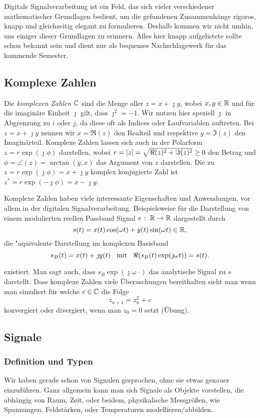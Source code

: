 %
Digitale Signalverarbeitung ist ein Feld, das sich vieler verschiedener mathematischer Grundlagen bedient, um die gefundenen Zusammenh\"ange rigoros, knapp und gleichzeitig elegant zu formulieren.
Deshalb kommen wir nicht umhin, uns einiger dieser Grundlagen zu erinnern. 
Alles hier knapp aufgelistete sollte schon bekannt sein und dient nur als bequemes Nachschlagewerk f\"ur das kommende Semester.
%
\subsection{Komplexe Zahlen}
%
Die \emph{komplexen Zahlen} $\mathbb{C}$ sind die Menge aller $z = x + \jmath y$, wobei $x,y \in \mathbb{R}$ und f\"ur die imagin\"are Einheit $\jmath$ gilt, dass $\jmath^2 = -1$.
Wir nutzen hier speziell $\jmath$ in Abgrenzung zu $i$ oder $j$, da diese oft als Indices oder Laufvariablen auftreten.
Bei $z = x + \jmath y$ nennen wir $x =\Re(z)$ den Realteil und respektive $y = \Im(z)$ den Imagin\"arteil.
Komplexe Zahlen lassen sich auch in der Polarform $z = r \exp(\jmath \phi)$ darstellen, wobei $r = {\left| z \right|} = \sqrt{\Re(z)^2 + \Im(z)^2} \geq 0$ den Betrag und $\phi = \angle(z) = \arctan(y,x)$ das Argument von $z$ darstellen.
Die zu $z = r \exp(\jmath \phi) = x + \jmath y$ komplex konjugierte Zahl ist $z^\ast = r \exp(-\jmath \phi) = x - \jmath y$.

Komplexe Zahlen haben viele interessante Eigenschaften und Anwendungen, vor allem in der digitalen Signalverarbeitung.
Beispielsweise f\"ur die Darstellung von einem modulierten reellen Passband Signal $s \hspace{0.5mm}:\hspace{1.0mm} \mathbb{R} \rightarrow \mathbb{R}$ dargestellt durch
\[
s(t) = x(t)\cos(\omega t) + y(t)\sin(\omega t) \in \mathbb{R},
\]
die "aquivalente Darstellung im komplexen Basisband
\begin{equation}\label{complex_baseband}
    s_B(t) = x(t) + \jmath y(t) {\hspace{3mm} \text{mit} \hspace{3mm}} \Re(s_B(t)\exp(\jmath \omega t)) = s(t).
\end{equation}

existiert. Man sagt auch, dass $s_B \exp(\jmath \omega \cdot)$ das analytische Signal zu $s$ darstellt. Dass komplexe Zahlen viele \"Uberaschungen bereithalten sieht man wenn man simuliert f\"ur welche $c \in \mathbb{C}$ die Folge
\[
z_{n+1} = z_{n}^2 + c
\]
konvergiert oder divergiert, wenn man $z_0 = 0$ setzt (\"Ubung). 
%
%
\subsection{Signale}
%
\subsubsection{Definition und Typen}
%
Wir haben gerade schon von Signalen gesprochen, ohne sie etwas genauer einzuf\"uhren. 
Ganz allgemein kann man sich Signale als Objekte vorstellen, die abh\"angig von Raum, Zeit, oder beidem, physikalische Messgr\"o\ss{}en, wie Spannungen, Feldst\"arken, oder Temperaturen modellieren/abbilden.

